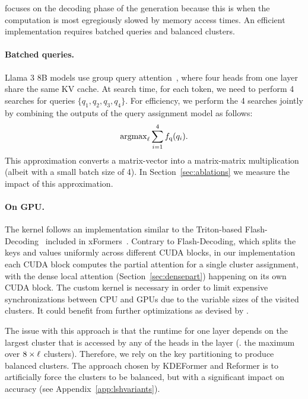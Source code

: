 \OURS focuses on the decoding phase of the generation because this is when the computation is most egregiously slowed by memory access times. 
An efficient implementation requires batched queries and balanced clusters. 

\paragraph{Batched queries.}
Llama 3 8B models use group query attention~\citep{ainslie2023gqatraininggeneralizedmultiquery}, where four heads from one layer share the same KV cache. 
At search time, for each token, we need to perform 4 searches for queries $\{q_1, q_2, q_3, q_4\}$. 
For efficiency, we perform the 4 searches jointly by combining the outputs of the query assignment model as follows: 
\begin{equation}
\mathrm{argmax}_{\ell} \sum_{i=1}^4 f_\mathrm{q}(q_i) .   
\end{equation}
This approximation converts a matrix-vector into a matrix-matrix multiplication (albeit with a small batch size of 4). 
In Section~\ref{sec:ablations} we measure the impact of this approximation.

%

%

%

%

%
%

\vspace{-0.2em}
\paragraph{On GPU.}

The \OURS kernel follows an implementation similar to the Triton-based Flash-Decoding~\citep{dao2023flash} included in xFormers~\citep{xFormers2022}. Contrary to Flash-Decoding, which splits the keys and values uniformly across different CUDA blocks, in our implementation each CUDA block computes the partial attention for a single cluster assignment, with the dense local attention (Section~\ref{sec:densepart}) happening on its own CUDA block.
%
The custom kernel is necessary in order to limit expensive synchronizations between CPU and GPUs due to the variable sizes of the visited clusters. 
It could benefit from further optimizations as devised by \citet{shah2024flashattention3}.

The issue with this approach is that the runtime for one layer depends on the largest cluster that is accessed by any of the heads in the layer (\ie. the maximum over 
$8\times\ell$ clusters). 
Therefore, we rely on the key partitioning to produce balanced clusters. 
The approach chosen by KDEFormer and Reformer is to artificially force the clusters to be balanced, but with a significant impact on accuracy (see Appendix~\ref{app:lshvariants}). 


%
%

%
%


%


